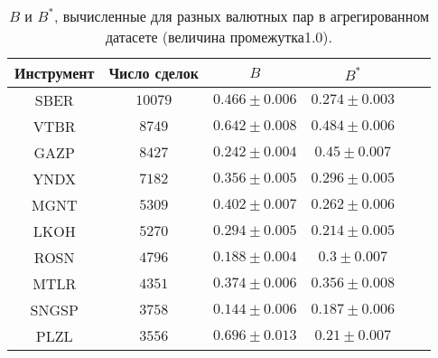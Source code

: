 \begin{table}[h!]
    \begin{center}
        \begin{tabular}{|c|c|c|c|c|c|}
            \hline
            Инструмент & Число сделок & $B$               & $B ^*$            \\ \hline
            SBER & $10079$ & $0.466 \pm 0.006$ & $0.274 \pm 0.003$ \\ \hline
            VTBR       & $8749$       & $0.642 \pm 0.008$ & $0.484 \pm 0.006$ \\ \hline
            GAZP       & $8427$       & $0.242 \pm 0.004$ & $0.45 \pm 0.007$  \\ \hline
            YNDX       & $7182$       & $0.356 \pm 0.005$ & $0.296 \pm 0.005$ \\ \hline
            MGNT       & $5309$       & $0.402 \pm 0.007$ & $0.262 \pm 0.006$ \\ \hline
            LKOH       & $5270$       & $0.294 \pm 0.005$ & $0.214 \pm 0.005$ \\ \hline
            ROSN       & $4796$       & $0.188 \pm 0.004$ & $0.3 \pm 0.007$   \\ \hline
            MTLR       & $4351$       & $0.374 \pm 0.006$ & $0.356 \pm 0.008$ \\ \hline
            SNGSP      & $3758$       & $0.144 \pm 0.006$ & $0.187 \pm 0.006$ \\ \hline
            PLZL       & $3556$       & $0.696 \pm 0.013$ & $0.21 \pm 0.007$  \\ \hline
        \end{tabular}
    \end{center}\caption{$B$ и $B ^*$, вычисленные для разных валютных пар в агрегированном датасете (величина промежутка1.0).}
    \label{Aggreg1CU1.0} \end{table}

